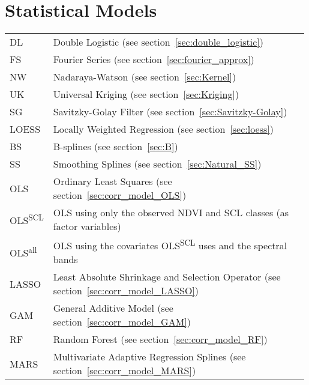 \section*{Statistical Models}\vspace{-0.2cm}
\begin{longtable}{p{0.12\linewidth} p{0.87\linewidth}}
	DL
		& Double Logistic (see section~\ref{sec:double_logistic})\\
	FS
		& Fourier Series (see section~\ref{sec:fourier_approx})\\
	NW
		& Nadaraya-Watson (see section~\ref{sec:Kernel})\\
	UK
		& Universal Kriging (see section~\ref{sec:Kriging})\\
	SG
		& Savitzky-Golay Filter (see section~\ref{sec:Savitzky-Golay})\\
	LOESS
		& Locally Weighted Regression (see section~\ref{sec:loess})\\
	BS
		& B-splines (see section~\ref{sec:B})\\
	SS
		& Smoothing Splines (see section~\ref{sec:Natural_SS})\\
	OLS
		& Ordinary Least Squares (see section~\ref{sec:corr_model_OLS})\\
	OLS\textsuperscript{SCL}
		& OLS using only the observed NDVI and SCL classes (as factor variables)\\
	OLS\textsuperscript{all}
		& OLS using the covariates OLS\textsuperscript{SCL} uses and the spectral bands\\
	LASSO
		& Least Absolute Shrinkage and Selection Operator (see section~\ref{sec:corr_model_LASSO})\\
	GAM
		& General Additive Model (see section~\ref{sec:corr_model_GAM})\\
	RF
		& Random Forest (see section~\ref{sec:corr_model_RF})\\
	MARS
		& Multivariate Adaptive Regression Splines (see section~\ref{sec:corr_model_MARS})\\
\end{longtable} \renewcommand{\arraystretch}{1}












